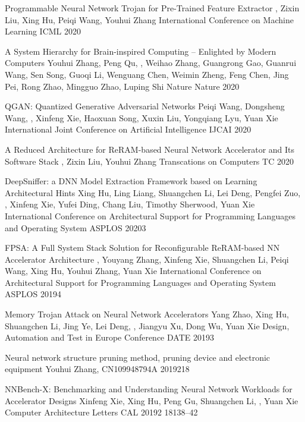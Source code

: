 \usepackage{format/publication}


{Programmable Neural Network Trojan for Pre-Trained Feature Extractor}
{, Zixin Liu, Xing Hu, Peiqi Wang, Youhui Zhang}
{International Conference on Machine Learning}
{ICML}
{2020}

{A System Hierarchy for Brain-inspired Computing -- Enlighted by Modern Computers}
{Youhui Zhang, Peng Qu, , Weihao Zhang, Guangrong Gao, Guanrui Wang, Sen Song, Guoqi Li, Wenguang Chen, Weimin Zheng, Feng Chen, Jing Pei, Rong Zhao, Mingguo Zhao, Luping Shi}
{Nature}
{Nature}
{2020}

{QGAN: Quantized Generative Adversarial Networks}
{Peiqi Wang, Dongsheng Wang, , Xinfeng Xie, Haoxuan Song, Xuxin Liu, Yongqiang Lyu, Yuan Xie}
{International Joint Conference on Artificial Intelligence}
{IJCAI}
{2020}

{A Reduced Architecture for ReRAM-based Neural Network Accelerator and Its Software Stack}
{, Zixin Liu, Youhui Zhang}
{Transcations on Computers}
{TC}
{2020}

{DeepSniffer: a DNN Model Extraction Framework based on Learning Architectural Hints}
{Xing Hu, Ling Liang, Shuangchen Li, Lei Deng, Pengfei Zuo, , Xinfeng Xie, Yufei Ding, Chang Liu, Timothy Sherwood, Yuan Xie}
{International Conference on Architectural Support for Programming Languages and Operating System}
{ASPLOS}
{2020}{3}

{FPSA: A Full System Stack Solution for Reconfigurable ReRAM-based NN Accelerator Architecture}
{, Youyang Zhang, Xinfeng Xie, Shuangchen Li, Peiqi Wang, Xing Hu, Youhui Zhang, Yuan Xie}
{International Conference on Architectural Support for Programming Languages and Operating System}
{ASPLOS}
{2019}{4}

{Memory Trojan Attack on Neural Network Accelerators}
{Yang Zhao, Xing Hu, Shuangchen Li, Jing Ye, Lei Deng, , Jiangyu Xu, Dong Wu, Yuan Xie}
{Design, Automation and Test in Europe Conference}
{DATE}
{2019}{3}

{Neural network structure pruning method, pruning device and electronic equipment}
{Youhui Zhang, }
{CN109948794A}
{2019}{2}{18}

{NNBench-X: Benchmarking and Understanding Neural Network Workloads for Accelerator Designs}
{Xinfeng Xie, Xing Hu, Peng Gu, Shuangchen Li, , Yuan Xie}
{Computer Architecture Letters}
{CAL}
{2019}{2}
{18}{1}{38--42}

